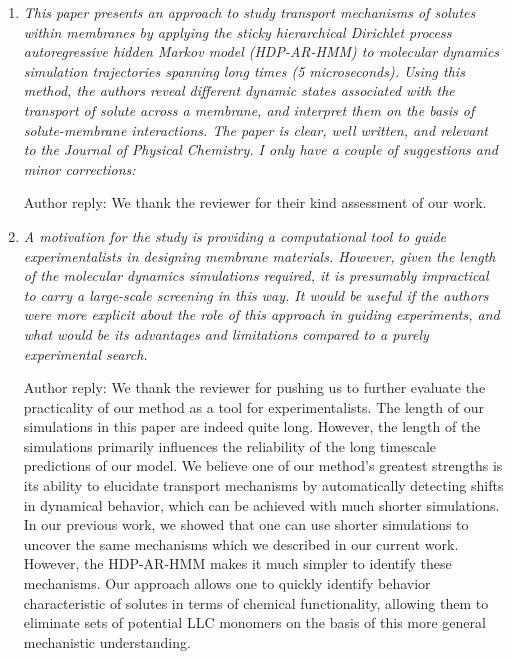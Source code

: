 \documentclass{article}
\begin{document}
\begin{enumerate}[label={Comment \theenumi :}, leftmargin=3.9\parindent]  

    \item \textit{This paper presents an approach to study transport mechanisms of solutes within
    membranes by applying the sticky hierarchical Dirichlet process autoregressive hidden Markov model
    (HDP-AR-HMM) to molecular dynamics simulation trajectories spanning long times (5 microseconds). 
    Using this method, the authors reveal different dynamic states associated with the transport of 
    solute across a membrane, and interpret them on the basis of solute-membrane interactions. The 
    paper is clear, well written, and relevant to the Journal of Physical Chemistry. I only have a 
    couple of suggestions and minor corrections:}
    
    Author reply: We thank the reviewer for their kind assessment of our work.

    \item \textit{A motivation for the study is providing a computational tool to guide experimentalists
    in designing membrane materials. However, given the length of the molecular dynamics simulations 
    required, it is presumably impractical to carry a large-scale screening in this way. It would be 
    useful if the authors were more explicit about the role of this approach in guiding experiments, 
    and what would be its advantages and limitations compared to a purely experimental search.}
    
    Author reply: We thank the reviewer for pushing us to further evaluate the practicality of our
    method as a tool for experimentalists. The length of our simulations in this paper are indeed 
    quite long. However, the length of the simulations primarily influences the reliability of the long
    timescale predictions of our model. We believe one of our method's greatest strengths is its 
    ability to elucidate transport mechanisms by automatically detecting shifts in dynamical
    behavior, which can be achieved with much shorter simulations. 
    In our previous work, we showed that one can use shorter simulations to uncover the same 
    mechanisms which we described in our current work.~\cite{coscia_chemically_2019} However, the
    HDP-AR-HMM makes it much simpler to identify these mechanisms. Our approach allows one to 
    quickly identify behavior characteristic of solutes in terms of chemical functionality, 
    allowing them to eliminate sets of potential LLC monomers on the basis of this more general
    mechanistic understanding. 
    

\end{enumerate}
\end{document}

